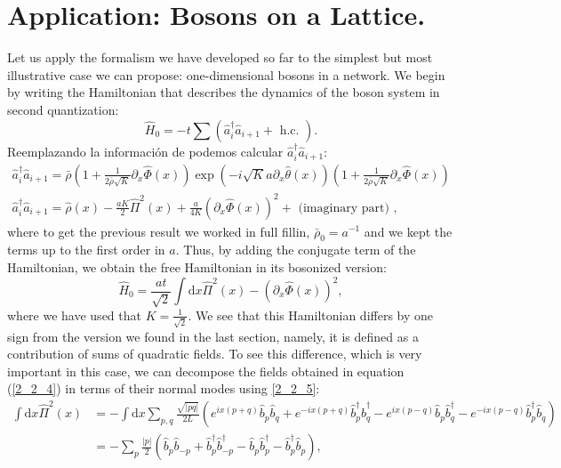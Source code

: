 \section{Application: Bosons on a Lattice.}
Let us apply the formalism we have developed so far to the simplest but most illustrative case we can propose: one-dimensional bosons in a network. We begin by writing the Hamiltonian that describes the dynamics of the boson system in second quantization:
\begin{equation} \label{aqui1}
\hat{H}_{0}=-t \sum\left(\hat{a}_{i}^{\dagger} \hat{a}_{i+1}+\text { h.c. }\right).
\end{equation}
Reemplazando la información de podemos calcular $\hat{a}_{i}^{\dagger} \hat{a}_{i+1} $:
\begin{equation}
    \begin{aligned}
        \hat{a}_{i}^{\dagger} \hat{a}_{i+1} =\bar{\rho}\left(1+\frac{1}{2 \bar{\rho} \sqrt{K}} \partial_{x} \hat{\Phi} (x)\right) \exp \left(-i \sqrt{K} a \partial_{x} \hat{\theta} (x)\right)\left(1+\frac{1}{2 \bar{\rho} \sqrt{K}} \partial_{x} \hat{\Phi} (x)\right) \\
        \hat{a}_{i}^{\dagger} \hat{a}_{i+1}=\hat{\rho}(x)-\frac{a K}{2} \hat{\Pi}^{2} (x)+\frac{a}{4 K}\left(\partial_{x} \hat{\Phi} (x)\right)^{2}+\text { (imaginary part) }, 
    \end{aligned}
\end{equation}
where to get the previous result we worked in full fillin, $\bar{\rho}_{0}=a^{-1}$ and we kept the terms up to the first order in $a$. Thus, by adding the conjugate term of the Hamiltonian, we obtain the free Hamiltonian in its bosonized version:
\begin{equation} \label{eq_hamiltonian_asd}
\hat{H}_{0}=\frac{a t}{\sqrt{2}} \int \mathrm{d} x \hat{\Pi}^{2} (x)-\left(\partial_{x} \hat{\Phi} (x)\right)^{2}, 
\end{equation}
where we have used that $K=\frac{1}{\sqrt{2}}$. We see that this Hamiltonian differs by one sign from the version we found in the last section, namely, it is defined as a contribution of sums of quadratic fields. To see this difference, which is very important in this case, we can decompose the fields obtained in equation (\ref{2_2_4}) in terms of their normal modes using \ref{2_2_5}:%
\begin{equation}
    \begin{aligned}
       \int \mathrm{d} x \hat{\Pi}^{2} (x) & =-\int \mathrm{d} x \sum_{p, q} \frac{\sqrt{|p q|}}{2 L}\left(e^{i x(p+q)} \hat{b}_{p} \hat{b}_{q}+e^{-i x(p+q)} \hat{b}_{p}^{\dagger} \hat{b}_{q}^{\dagger}-e^{i x(p-q)} \hat{b}_{p} \hat{b}_{q}^{\dagger}-e^{-i x(p-q)} \hat{b}_{p}^{\dagger} \hat{b}_{q}\right) \\
& =-\sum_{p} \frac{|p|}{2}\left(\hat{b}_{p} \hat{b}_{-p}+\hat{b}_{p}^{\dagger} \hat{b}_{-p}^{\dagger}-\hat{b}_{p} \hat{b}_{p}^{\dagger}-\hat{b}_{p}^{\dagger} \hat{b}_{p}\right),  
    \end{aligned}
\end{equation}
